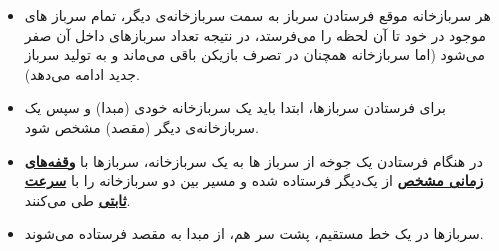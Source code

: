 \documentclass[]{article}
\begin{document}
\begin{itemize}
{\begin{itemize}
{    }
    \item{
هر سربازخانه موقع فرستادن سرباز به سمت سربازخانه‌ی دیگر، تمام سرباز های موجود در خود تا آن لحظه را می‌فرستد، در نتیجه تعداد سربازهای داخل آن صفر می‌شود (اما سربازخانه همچنان در تصرف بازیکن باقی می‌ماند و به تولید سرباز جدید ادامه می‌دهد).
    }
    \item{
برای فرستادن سربازها، ابتدا باید یک سربازخانه خودی (مبدا) و سپس یک سربازخانه‌ی دیگر (مقصد) مشخص شود. 
    }
    \item{
در هنگام فرستادن یک جوخه‌ از سرباز ها به یک سربازخانه، سربازها با 
\textbf{\underline{وقفه‌های زمانی مشخص}}
از یک‌دیگر فرستاده شده و مسیر بین دو سربازخانه را با
\textbf{\underline{سرعت ثابتی}}
طی می‌کنند.
    }
    \item{
سربازها در یک خط مستقیم، پشت سر هم، از مبدا به مقصد فرستاده می‌شوند.

}
\end{itemize}}
\end{itemize}
\end{document}
